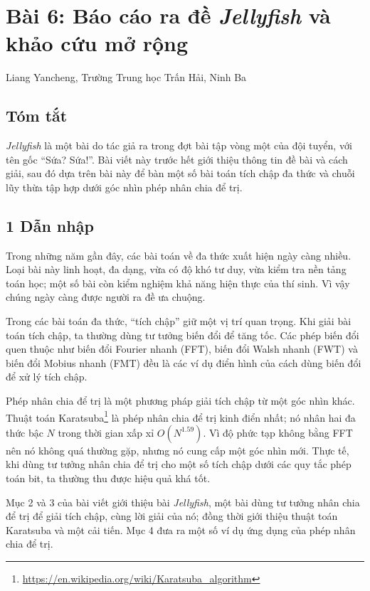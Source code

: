 \documentclass[11pt]{article}
\begin{document}
\section{Bài 6: Báo cáo ra đề \emph{Jellyfish} và khảo cứu mở rộng}

\begin{center}
Liang Yancheng, Trường Trung học Trấn Hải, Ninh Ba
\end{center}

\subsection*{Tóm tắt}

\emph{Jellyfish} là một bài do tác giả ra trong đợt bài tập vòng một của đội
tuyển, với tên gốc ``Sứa? Sứa!''. Bài viết này trước hết giới thiệu thông tin
đề bài và cách giải, sau đó dựa trên bài này để bàn một số bài toán tích chập
đa thức và chuỗi lũy thừa tập hợp dưới góc nhìn phép nhân chia để trị.

\subsection*{1 Dẫn nhập}

Trong những năm gần đây, các bài toán về đa thức xuất hiện ngày càng nhiều.
Loại bài này linh hoạt, đa dạng, vừa có độ khó tư duy, vừa kiểm tra nền tảng
toán học; một số bài còn kiểm nghiệm khả năng hiện thực của thí sinh. Vì vậy
chúng ngày càng được người ra đề ưa chuộng.

Trong các bài toán đa thức, ``tích chập'' giữ một vị trí quan trọng. Khi giải
bài toán tích chập, ta thường dùng tư tưởng biến đổi để tăng tốc. Các phép biến
đổi quen thuộc như biến đổi Fourier nhanh (FFT), biến đổi Walsh nhanh (FWT) và
biến đổi Mobius nhanh (FMT) đều là các ví dụ điển hình của cách dùng biến đổi
để xử lý tích chập.

Phép nhân chia để trị là một phương pháp giải tích chập từ một góc nhìn khác.
Thuật toán Karatsuba\footnote{\url{https://en.wikipedia.org/wiki/Karatsuba_algorithm}}
là phép nhân chia để trị kinh điển nhất; nó nhân hai đa thức bậc \(N\) trong
thời gian xấp xỉ \(O(N^{1.59})\). Vì độ phức tạp không bằng FFT nên nó không
quá thường gặp, nhưng nó cung cấp một góc nhìn mới. Thực tế, khi dùng tư tưởng
nhân chia để trị cho một số tích chập dưới các quy tắc phép toán bit, ta thường
thu được hiệu quả khá tốt.

Mục 2 và 3 của bài viết giới thiệu bài \emph{Jellyfish}, một bài dùng tư tưởng
nhân chia để trị để giải tích chập, cùng lời giải của nó; đồng thời giới thiệu
thuật toán Karatsuba và một cải tiến. Mục 4 đưa ra một số ví dụ ứng dụng của
phép nhân chia để trị.
\end{document}
